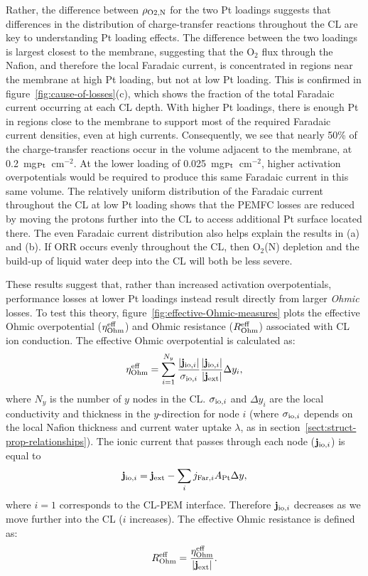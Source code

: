 \documentclass[final,3p,times,twocolumn]{elsarticle}    %
\begin{document}
Rather, the difference between $\rho_{\rm O2,N}$ for the two Pt loadings suggests that differences in the distribution of charge-transfer reactions throughout the CL are key to understanding Pt loading effects. The difference between the two loadings is largest closest to the membrane, suggesting that the O$_2$ flux through the Nafion, and therefore the local Faradaic current, is concentrated in regions near the membrane at high Pt loading, but not at low Pt loading. This is confirmed in figure~\ref{fig:cause-of-losses}(c), which shows the fraction of the total Faradaic current occurring at each CL depth. With higher Pt loadings, there is enough Pt in regions close to the membrane to support most of the required Faradaic current densities, even at high currents. Consequently, we see that nearly 50\% of the charge-transfer reactions occur in the volume adjacent to the membrane, at 0.2~mg$_{\rm Pt}$~cm$^{-2}$. At the lower loading of 0.025~mg$_{\rm Pt}$~cm$^{-2}$, higher activation overpotentials would be required to produce this same Faradaic current in this same volume. The relatively uniform distribution of the Faradaic current throughout the CL at low Pt loading shows that the PEMFC losses are reduced by moving the protons further into the CL to access additional Pt surface located there. The even Faradaic current distribution also helps explain the results in (a) and (b). If ORR occurs evenly throughout the CL, then O$_{2}$(N) depletion and the build-up of liquid water deep into the CL will both be less severe.

These results suggest that, rather than increased activation overpotentials, performance losses at lower Pt loadings instead result directly from larger \emph{Ohmic} losses. To test this theory, figure~\ref{fig:effective-Ohmic-measures} plots the effective Ohmic overpotential ($\eta_{\rm Ohm}^{\rm eff}$) and Ohmic resistance ($R_{\rm Ohm}^{\rm eff}$) associated with CL ion conduction. The effective Ohmic overpotential is calculated as:
\begin{equation}
    \eta_{\rm Ohm}^{\rm eff} = \sum_{i=1}^{N_{y}} \frac{|{\bf j}_{{\rm io},i}|}{\sigma_{{\rm io},i}}
                          \frac{|{\bf j}_{{\rm io},i}|}{|{\bf j}_{\rm ext}|} \Delta y_i,
\end{equation}
where $N_y$ is the number of $y$ nodes in the CL. $\sigma_{{\rm io},i}$ and $\Delta y_{i}$ are the local conductivity and thickness in the $y$-direction for node $i$ (where $\sigma_{{\rm io},i}$ depends on the local Nafion thickness and current water uptake $\lambda$, as in section~\ref{sect:struct-prop-relationships}). The ionic current that passes through each node (${\bf j}_{{\rm io},i}$) is equal to
\begin{equation} \label{eq:eta-ohm-eff}
    {\bf j}_{{\rm io},i} = {\bf j}_{\rm ext} - \sum_i j_{{\rm Far},i} A_{\rm Pt} \Delta y, 
\end{equation}
where $i=1$ corresponds to the CL-PEM interface. Therefore ${\bf j}_{{\rm io},i}$ decreases as we move further into the CL ($i$ increases). The effective Ohmic resistance is defined as:
\begin{equation} \label{eq:R-ohm-eff}
    R_{\rm Ohm}^{\rm eff} = \frac{\eta_{\rm Ohm}^{\rm eff}}{|{\bf j}_{\rm ext}|}.
\end{equation}
\end{document}
